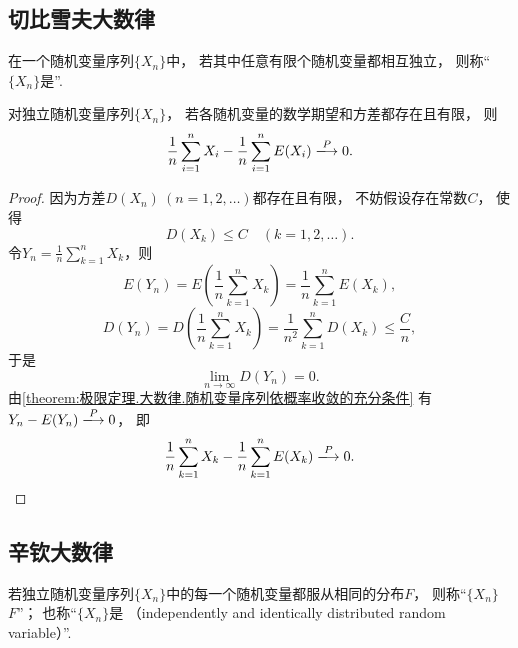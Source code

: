 \subsection{切比雪夫大数律}
\begin{definition}
在一个随机变量序列\(\{X_n\}\)中，
若其中任意有限个随机变量都相互独立，
则称“\(\{X_n\}\)是”.
\end{definition}

\begin{theorem}[切比雪夫大数律]\label{theorem:极限定理.大数律.切比雪夫大数律}
对独立随机变量序列\(\{X_n\}\)，
若各随机变量的数学期望和方差都存在且有限，
则\begin{equation*}
	\frac1n \sum_{i=1}^n X_i
	- \frac1n \sum_{i=1}^n E(X_i)
	\toP 0.
\end{equation*}
\begin{proof}
因为方差\(D(X_n)\ (n=1,2,\dotsc)\)都存在且有限，
不妨假设存在常数\(C\)，
使得\begin{equation*}
	D(X_k) \leq C
	\quad(k=1,2,\dotsc).
\end{equation*}
\def\Yn{\frac1n \sum_{k=1}^n X_k}
令\(Y_n=\Yn\)，则\begin{equation*}
	E(Y_n)
	= E\left(\Yn\right)
	= \frac1n \sum_{k=1}^n E(X_k),
\end{equation*}\begin{equation*}
	D(Y_n)
	= D\left(\Yn\right)
	= \frac{1}{n^2} \sum_{k=1}^n D(X_k) \leq \frac{C}{n},
\end{equation*}
于是\begin{equation*}
	\lim_{n\to\infty} D(Y_n)
	= 0.
\end{equation*}
由\cref{theorem:极限定理.大数律.随机变量序列依概率收敛的充分条件}
有\(Y_n - E(Y_n) \toP 0\)，
即\begin{equation*}
	\frac1n \sum_{k=1}^n X_k
	- \frac1n \sum_{k=1}^n E(X_k)
	\toP 0.
	\qedhere
\end{equation*}
\end{proof}
\end{theorem}

\subsection{辛钦大数律}
\begin{definition}
若独立随机变量序列\(\{X_n\}\)中的每一个随机变量都服从相同的分布\(F\)，
则称“\(\{X_n\}\)  \(F\)”；
也称“\(\{X_n\}\)是%
（independently and identically distributed random variable）”.
\end{definition}

